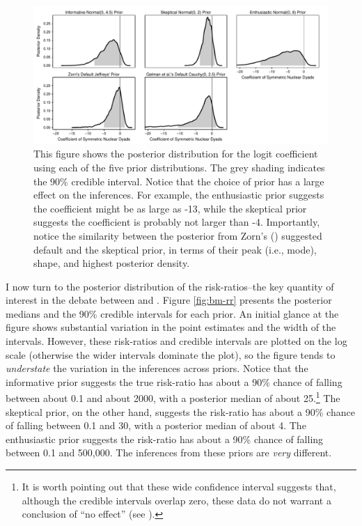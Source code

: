 \documentclass[12pt]{article}
\begin{document}
\begin{figure}[H]
\begin{center}
\includegraphics[scale = .8]{figs/bm-posterior-density.pdf}
\caption{This figure shows the posterior distribution for the logit coefficient using each of the five prior distributions.  
The grey shading indicates the 90\% credible interval. 
Notice that the choice of prior has a large effect on the inferences. 
For example, the enthusiastic prior suggests the coefficient might be as large as -13, while the skeptical prior suggests the coefficient is probably not larger than -4. 
Importantly, notice the similarity between the posterior from Zorn's (\citeyear{Zorn2005}) suggested default and the skeptical prior, in terms of their peak (i.e., mode), shape, and highest posterior density.}\label{fig:bm-posterior-density}
\end{center}
\end{figure}

I now turn to the posterior distribution of the risk-ratios--the key quantity of interest in the debate between \cite{BellMiller2015} and \cite{Rauchhaus2009}. 
Figure \ref{fig:bm-rr} presents the posterior medians and the 90\% credible intervals for each prior. 
An initial glance at the figure shows substantial variation in the point estimates and the width of the intervals. 
However, these risk-ratios and credible intervals are plotted on the log scale (otherwise the wider intervals dominate the plot), so the figure tends to \textit{understate} the variation in the inferences across priors. 
Notice that the informative prior suggests the true risk-ratio has about a 90\% chance of falling between about 0.1 and about 2000, with a posterior median of about 25.\footnote{
It is worth pointing out that these wide confidence interval suggests that, although the credible intervals overlap zero, these data do not warrant a conclusion of ``no effect'' (see \citealt{Rainey2014a}).} 
The skeptical prior, on the other hand, suggests the risk-ratio has about a 90\% chance of falling between 0.1 and 30, with a posterior median of about 4. 
The enthusiastic prior suggests the risk-ratio has about a 90\% chance of falling between 0.1 and 500,000. 
The inferences from these priors are \emph{very} different. 
\end{document}
